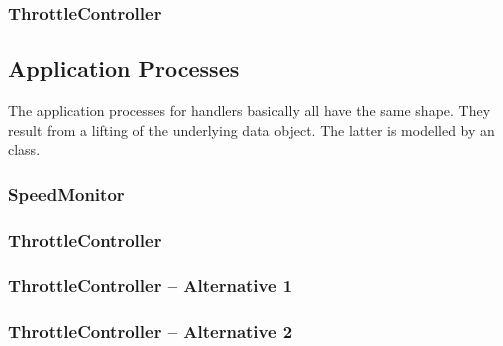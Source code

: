 \documentclass{article}
\begin{document}
\subsubsection{ThrottleController}

\begin{circusbox}

\end{circusbox}

\subsection{Application Processes}

The application processes for handlers basically all have the same shape. They result from a lifting of the underlying data object. The latter is modelled by an {\OhCircus} class.

\subsubsection{SpeedMonitor}

\begin{circusbox}

\end{circusbox}

\subsubsection{ThrottleController}

\begin{circusbox}

\end{circusbox}

\subsubsection{ThrottleController -- Alternative 1}

\begin{circusbox}

\end{circusbox}

\subsubsection{ThrottleController -- Alternative 2}

\begin{circusbox}

\end{circusbox}
\end{document}
